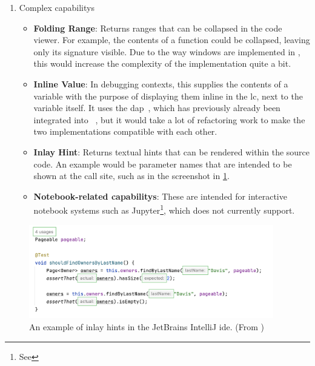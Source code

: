 \documentclass[../thesis]{subfiles}
\begin{document}
\begin{enumerate}
\begin{itemize}
	      \end{itemize}
	\item {Complex \glspl{capability}}
	      \begin{itemize}
		      \item \textbf{Folding Range}: Returns \glspl{range} that can be collapsed in the code viewer.
		            For example, the contents of a function could be collapsed, leaving only its signature visible.
		            Due to the way \glspl{window} are implemented in \SEE{}, this would increase the complexity of the implementation quite a bit.
		      \item \textbf{Inline Value}: In debugging contexts, this supplies the contents of a variable with the purpose of displaying them inline in the \gls{lc}, next to the variable itself.
		            It uses the \gls{dap}~\cite{dap}, which has previously already been integrated into \SEE{}~\cite{rohlfing2022}, but it would take a lot of refactoring work to make the two implementations compatible with each other.
		      \item \textbf{Inlay Hint}: Returns textual hints that can be rendered within the source code.
		            An example would be parameter names that are intended to be shown at the call site, such as in the screenshot in \cref{fig:inlay}.
		      \item \textbf{Notebook-related \glspl{capability}}: These are intended for interactive notebook systems such as Jupyter\footnote{See }, which \SEE{} does not currently support.
	      \end{itemize}
\end{enumerate}

\begin{figure}
	\begin{center}
		\includegraphics[width=0.95\textwidth]{figures/inlay_hints_example}
	\end{center}
	\caption{An example of inlay hints in the JetBrains IntelliJ \gls{ide}. (From )}\label{fig:inlay}
\end{figure}
\end{document}
